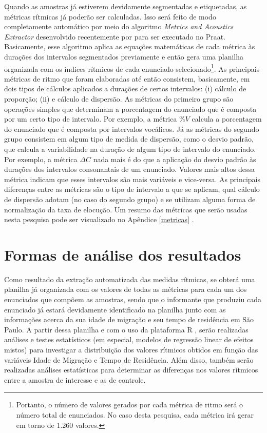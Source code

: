 \documentclass[
	a4paper,	%
	12pt,		%
	]{article}	%
\begin{document}
Quando as amostras já estiverem devidamente segmentadas e etiquetadas, as
métricas rítmicas já poderão ser calculadas. Isso será feito de modo
completamente automático por meio do algoritmo \emph{Metrics and Acoustics
	Extractor} desenvolvido recentemente por \citet{Junior.Barbosa2019} para ser
executado no Praat. Basicamente, esse algoritmo aplica as equações matemáticas
de cada métrica às durações dos intervalos segmentados previamente e então gera
uma planilha organizada com os índices rítmicos de cada enunciado
selecionado\footnote{Portanto, o número de valores gerados por cada métrica de
	ritmo será o número total de enunciados. No caso desta pesquisa, cada
	métrica irá gerar em torno de 1.260 valores.}.  As principais métricas de
ritmo que foram elaboradas até então consistem, basicamente, em dois tipos de
cálculos aplicados a durações de certos intervalos: (i) cálculo de proporção;
(ii) e cálculo de dispersão. As métricas do primeiro grupo são operações simples
que determinam a porcentagem do enunciado que é composta por um certo tipo de
intervalo. Por exemplo, a métrica $\%V$ \citep{Ramus.etal1999} calcula a
porcentagem do enunciado que é composta por intervalos vocálicos. Já as métricas
do segundo grupo consistem em algum tipo de medida de dispersão, como o desvio
padrão, que calcula a variabilidade na duração de algum tipo de intervalo do
enunciado. Por exemplo, a métrica $\Delta C$ \citep{Ramus.etal1999} nada mais é
do que a aplicação do desvio padrão às durações dos intervalos consonantais de
um enunciado. Valores mais altos dessa métrica indicam que esses intervalos são
mais variáveis e vice-versa. As principais diferenças entre as métricas são o
tipo de intervalo a que se aplicam, qual cálculo de dispersão adotam (no caso do
segundo grupo) e se utilizam alguma forma de normalização da taxa de elocução.
Um resumo das métricas que serão usadas nesta pesquisa pode ser visualizado no
Apêndice \ref{metricas} .

\section{Formas de análise dos resultados} \label{analise}

Como resultado da extração automatizada das medidas rítmicas, se obterá uma
planilha já organizada com os valores de todas as métricas para cada um dos
enunciados que compõem as amostras, sendo que o informante que produziu cada
enunciado já estará devidamente identificado na planilha junto com as
informações acerca da sua idade de migração e seu tempo de residência em São
Paulo. A partir dessa planilha e com o uso da plataforma R
\citep{RCoreTeam2019}, serão realizadas análises e testes estatísticos (em
especial, modelos de regressão linear de efeitos mistos) para investigar a
distribuição dos valores rítmicos obtidos em função das variáveis Idade de
Migração e Tempo de Residência. Além disso, também serão realizadas análises
estatísticas para determinar as diferenças nos valores rítmicos entre a amostra
de interesse e as de controle. 
	
{ %
	\printbibliography
}
\end{document}
